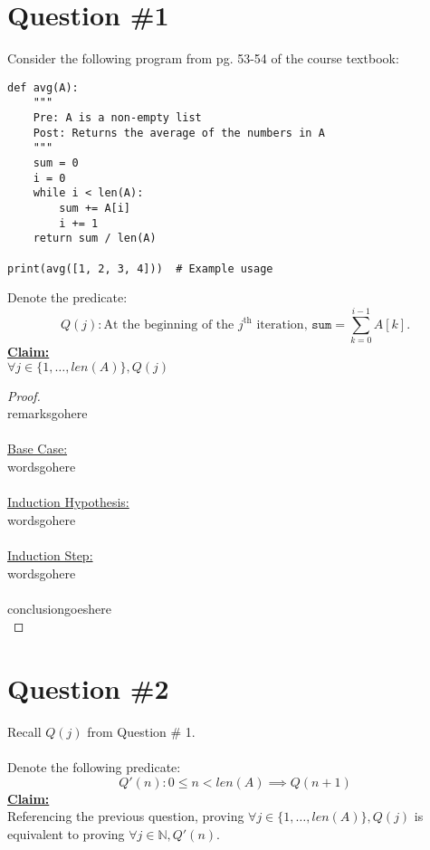 \documentclass[12pt]{article}
\begin{document}
\renewcommand{\familydefault}{\rmdefault}



\pagebreak
\normalsize

\section*{Question \#1}
Consider the following program from pg. 53-54 of the course textbook:
\begin{lstlisting}
def avg(A):
    """
    Pre: A is a non-empty list
    Post: Returns the average of the numbers in A
    """
    sum = 0
    i = 0
    while i < len(A):
        sum += A[i]
        i += 1
    return sum / len(A)

print(avg([1, 2, 3, 4]))  # Example usage
\end{lstlisting}
Denote the predicate:
\[
Q(j): \text{At the beginning of the } j^{\text{th}} \text{ iteration, } \texttt{sum} = \sum_{k=0}^{i-1} A[k].
\]
\textbf{\underline{Claim:}} \\
$\forall j \in \{1, \dots, len(A)\}, Q(j)$
\begin{proof}
\leavevmode\\
    remarksgohere \\
    \\
    \underline{Base Case:} \\
    wordsgohere \\
    \\
    \underline{Induction Hypothesis:} \\
    wordsgohere \\
    \\
    \underline{Induction Step:} \\
    wordsgohere \\
    \\
    conclusiongoeshere \\
\end{proof}

\section*{Question \#2}
Recall \(Q(j)\) from Question \# 1. \\
\\
Denote the following predicate:
\[
    Q'(n): 0 \leq n < len(A) \implies Q(n + 1)
\]
\textbf{\underline{Claim:}} \\
Referencing the previous question, proving $\forall j \in \{ 1, \dots, len(A) \}, Q(j)$ is equivalent to proving $\forall j \in \mathbb{N}, Q'(n)$.
\end{document}
